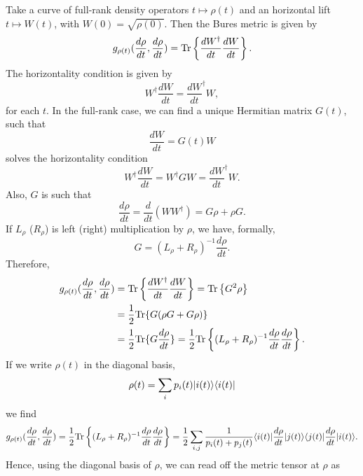 Take a curve of full-rank density operators $t\mapsto \rho(t)$ and an horizontal lift $t\mapsto W(t)$, with $W(0)=\sqrt{\rho(0)}$. Then the Bures metric is given by
\begin{equation*}
g_{\rho(t)}(\frac{d\rho}{dt},\frac{d\rho}{dt})=\text{Tr} \left\{\frac{dW^{\dagger}}{dt}\frac{dW}{dt}\right\}.
\end{equation*}
The horizontality condition is given by
\begin{equation*}
W^{\dagger}\frac{dW}{dt}=\frac{dW}{dt}^{\dagger}W,
\end{equation*}
for each $t$. In the full-rank case, we can find a unique Hermitian matrix $G(t)$, such that 
\begin{equation*}
\frac{dW}{dt}=G(t)W
\end{equation*}
solves the horizontality condition
\begin{equation*}
W^{\dagger}\frac{dW}{dt}=W^{\dagger}GW=\frac{dW}{dt}^{\dagger}W.
\end{equation*} 
Also, $G$ is such that
\begin{equation*}
\frac{d\rho}{dt}=\frac{d}{dt}(WW^{\dagger})=G\rho+\rho G.
\end{equation*}
If $L_{\rho}$ ($R_\rho$) is left  (right) multiplication by $\rho$, we have, formally,
\begin{equation*}
G=(L_{\rho}+R_{\rho})^{-1}\frac{d\rho}{dt}.
\end{equation*}
Therefore,
\begin{eqnarray*}
g_{\rho(t)}(\frac{d\rho}{dt},\frac{d\rho}{dt})&=\text{Tr} \left\{\frac{dW^{\dagger}}{dt}\frac{dW}{dt}\right\}=\text{Tr}\left\{G^2\rho\right\}\\
&=\frac{1}{2}\text{Tr}\{G(\rho G+G\rho)\}\\
&=\frac{1}{2}\text{Tr}\{G\frac{d\rho}{dt}\}=\frac{1}{2}\text{Tr}\left\{(L_{\rho}+R_{\rho})^{-1}\frac{d\rho}{dt}\frac{d\rho}{dt}\right\}.
\end{eqnarray*}
If we write $\rho(t)$ in the diagonal basis,
\begin{equation*}
\rho(t)=\sum_{i}p_i(t)| i(t) \rangle\langle i(t) |
\end{equation*}
we find
\begin{equation*}
g_{\rho(t)}(\frac{d\rho}{dt},\frac{d\rho}{dt})=\frac{1}{2}\text{Tr}\left\{(L_{\rho}+R_{\rho})^{-1}\frac{d\rho}{dt}\frac{d\rho}{dt}\right\}
=\frac{1}{2}\sum_{i,j}\frac{1}{p_i(t)+p_j(t)}\langle i(t) |\frac{d\rho}{dt}| j(t) \rangle\langle j(t) |\frac{d\rho}{dt}| i(t) \rangle.
\end{equation*}
Hence, using the diagonal basis of $\rho$, we can read off the metric tensor at $\rho$ as

